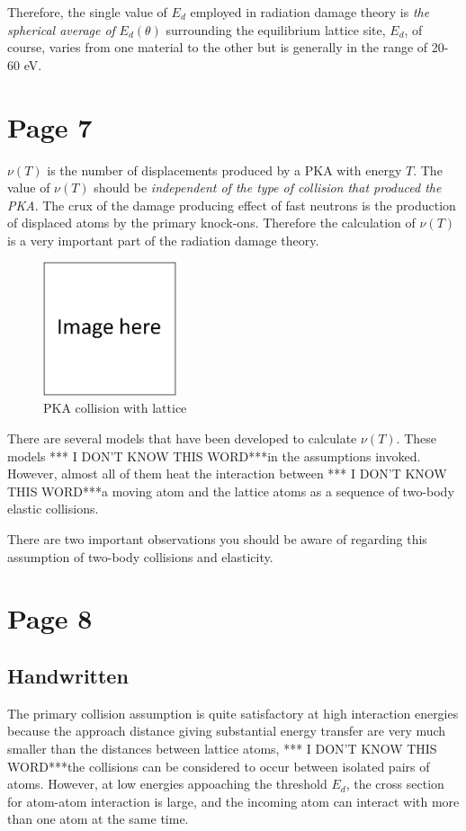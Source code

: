\documentclass[11pt]{article}
\newcommand{\IDK}{*** I DON'T KNOW THIS WORD***}
\begin{document}
Therefore, the single value of $E_d$ employed in radiation damage theory is \textit{the spherical average of} $E_d(\theta)$ surrounding the equilibrium lattice site, $E_d$, of course, varies from one material to the other but is generally in the range of 20-60 eV.

\section{Page 7}
$\nu(T)$ is the number of displacements produced by a PKA with energy $T$. The value of $\nu(T)$ should be \textit{independent of the type of collision that produced the PKA}. The crux of the damage producing effect of fast neutrons is the production of displaced atoms by the primary knock-ons. Therefore the calculation of $\nu(T)$ is a very important part of the radiation damage theory.

\begin{figure}
  \begin{center}
  \includegraphics[width=0.35\textwidth]{figs/fillImage.png}
  \end{center}
  \caption{PKA collision with lattice}
\end{figure}

There are several models that have been developed to calculate $\nu(T)$. These models \IDK in the assumptions invoked. However, almost all of them heat the interaction between \IDK a moving atom and the lattice atoms as a sequence of two-body elastic collisions.

There are two important observations you should be aware of regarding this assumption of two-body collisions and elasticity.

\section{Page 8}
\subsection{Handwritten}
The primary collision assumption is quite satisfactory at high interaction energies because the approach distance giving substantial energy transfer are very much smaller than the distances between lattice atoms, \IDK the collisions can be considered to occur between isolated pairs of atoms. However, at low energies appoaching the threshold $E_d$, the cross section for atom-atom interaction is large, and the incoming atom can interact with more than one atom at the same time.
\end{document}
